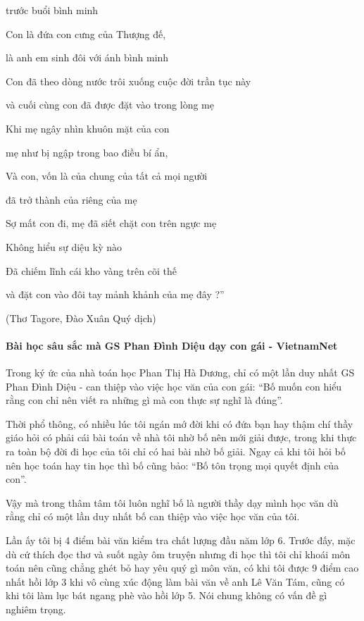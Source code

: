 trước buổi bình minh

Con là đứa con cưng của Thượng đế,

là anh em sinh đôi với ánh bình minh

Con đã theo dòng nước trôi xuống cuộc đời trần tục này

và cuối cùng con đã được đặt vào trong lòng mẹ

Khi mẹ ngây nhìn khuôn mặt của con

mẹ như bị ngập trong bao điều bí ẩn,

Và con, vốn là của chung của tất cả mọi người

đã trở thành của riêng của mẹ

Sợ mất con đi, mẹ đã siết chặt con trên ngực mẹ

Không hiểu sự diệu kỳ nào

Đã chiếm lĩnh cái kho vàng trên cõi thế

và đặt con vào đôi tay mảnh khảnh của mẹ đây ?”

(Thơ Tagore, Đào Xuân Quý dịch) 

\paragraph{Bài học sâu sắc mà GS Phan Đình Diệu dạy con gái - VietnamNet}

Trong ký ức của nhà toán học Phan Thị Hà Dương, chỉ có một lần duy nhất GS Phan Đình Diệu - can thiệp vào việc học văn của con gái: “Bố muốn con hiểu rằng con chỉ nên viết ra những gì mà con thực sự nghĩ là đúng”.

Thời phổ thông, có nhiều lúc tôi ngán mớ đời khi có đứa bạn hay thậm chí thầy giáo hỏi có phải cái bài toán về nhà tôi nhờ bố nên mới giải được, trong khi thực ra toàn bộ đời đi học của tôi chỉ có hai bài nhờ bố giải. Ngay cả khi tôi hỏi bố nên học toán hay tin học thì bố cũng bảo: “Bố tôn trọng mọi quyết định của con”.

Vậy mà trong thâm tâm tôi luôn nghĩ bố là người thầy dạy mình học văn dù rằng chỉ có một lần duy nhất bố can thiệp vào việc học văn của tôi.

Lần ấy tôi bị 4 điểm bài văn kiểm tra chất lượng đầu năm lớp 6. Trước đấy, mặc dù cứ thích đọc thơ và suốt ngày ôm truyện nhưng đi học thì tôi chỉ khoái môn toán nên cũng chẳng ghét bỏ hay yêu quý gì môn văn, có khi tôi được 9 điểm cao nhất hồi lớp 3 khi vô cùng xúc động làm bài văn về anh Lê Văn Tám, cũng có khi tôi làm lục bát ngang phè vào hồi lớp 5. Nói chung không có vấn đề gì nghiêm trọng.

